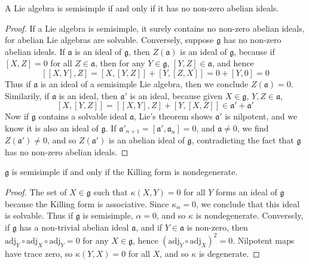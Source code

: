 \begin{lemma}
    A Lie algebra is semisimple if and only if it has no non-zero abelian ideals.
\end{lemma}
\begin{proof}
    If a Lie algebra is semisimple, it surely contains no non-zero abelian ideals, for abelian Lie algebras are solvable. Conversely, suppose $\mathfrak{g}$ has no non-zero abelian ideals. If $\mathfrak{a}$ is an ideal of $\mathfrak{g}$, then $Z(\mathfrak{a})$ is an ideal of $\mathfrak{g}$, because if $[X,Z] = 0$ for all $Z \in \mathfrak{a}$, then for any $Y \in \mathfrak{g}$, $[Y,Z] \in \mathfrak{a}$, and hence
    \[ [[X,Y],Z] = [X,[Y,Z]] + [Y,[Z,X]] = 0 + [Y,0] = 0 \]
    Thus if $\mathfrak{a}$ is an ideal of a semisimple Lie algebra, then we conclude $Z(\mathfrak{a}) = 0$. Similarily, if $\mathfrak{a}$ is an ideal, then $\mathfrak{a}'$ is an ideal, because given $X \in \mathfrak{g}$, $Y,Z \in \mathfrak{a}$,
    \[ [X,[Y,Z]] = [[X,Y],Z] + [Y,[X,Z]] \in \mathfrak{a}' + \mathfrak{a}' \]
    Now if $\mathfrak{g}$ contains a solvable ideal $\mathfrak{a}$, Lie's theorem shows $\mathfrak{a}'$ is nilpotent, and we know it is also an ideal of $\mathfrak{g}$. If $\mathfrak{a}'_{n+1} = [\mathfrak{a}', \mathfrak{a}_n] = 0$, and $\mathfrak{a} \neq 0$, we find $Z(\mathfrak{a}') \neq 0$, and so $Z(\mathfrak{a}')$ is an abelian ideal of $\mathfrak{g}$, contradicting the fact that $\mathfrak{g}$ has no non-zero abelian ideals.
\end{proof}

\begin{theorem}
    $\mathfrak{g}$ is semisimple if and only if the Killing form is nondegenerate.
\end{theorem}
\begin{proof}
    The set of $X \in \mathfrak{g}$ such that $\kappa(X,Y) = 0$ for all $Y$ forms an ideal of $\mathfrak{g}$ because the Killing form is associative. Since $\kappa_\alpha = 0$, we conclude that this ideal is solvable. Thus if $\mathfrak{g}$ is semisimple, $\alpha = 0$, and so $\kappa$ is nondegenerate. Conversely, if $\mathfrak{g}$ has a non-trivial abelian ideal $\mathfrak{a}$, and if $Y \in \mathfrak{a}$ is non-zero, then $\text{adj}_Y \circ \text{adj}_X \circ \text{adj}_Y = 0$ for any $X \in \mathfrak{g}$, hence $(\text{adj}_Y \circ \text{adj}_X)^2 = 0$. Nilpotent maps have trace zero, so $\kappa(Y,X) = 0$ for all $X$, and so $\kappa$ is degenerate.
\end{proof}


